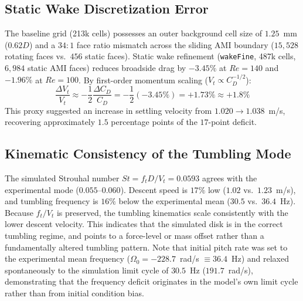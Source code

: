 \documentclass[11pt,a4paper]{article}
\begin{document}
\subsection{Static Wake Discretization Error}
The baseline grid (213k cells) possesses an outer background cell size of $1.25$~mm ($0.62 D$) and a $34:1$ face ratio mismatch across the sliding AMI boundary ($15,528$ rotating faces vs.\ $456$ static faces). Static wake refinement (\texttt{wakeFine}, 487k cells, $6,984$ static AMI faces) reduces broadside drag by $-3.45\%$ at $Re = 140$ and $-1.96\%$ at $Re = 100$. By first-order momentum scaling ($V_t \propto C_D^{-1/2}$):
\begin{equation}
\frac{\Delta V_t}{V_t} \approx -\frac{1}{2} \frac{\Delta C_D}{C_D} = -\frac{1}{2}(-3.45\%) = +1.73\% \approx +1.8\%
\end{equation}
This proxy suggested an increase in settling velocity from $1.020 \to 1.038$~m/s, recovering approximately $1.5$ percentage points of the $17$-point deficit.

\subsection{Kinematic Consistency of the Tumbling Mode}
The simulated Strouhal number $St = f_t D / V_t = 0.0593$ agrees with the experimental mode ($0.055$--$0.060$). Descent speed is $17\%$ low ($1.02$ vs.\ $1.23$~m/s), and tumbling frequency is $16\%$ below the experimental mean ($30.5$ vs.\ $36.4$~Hz). Because $f_t / V_t$ is preserved, the tumbling kinematics scale consistently with the lower descent velocity. This indicates that the simulated disk is in the correct tumbling regime, and points to a force-level or mass offset rather than a fundamentally altered tumbling pattern. Note that initial pitch rate was set to the experimental mean frequency ($\Omega_0 = -228.7$~rad/s $\equiv 36.4$~Hz) and relaxed spontaneously to the simulation limit cycle of $30.5$~Hz ($191.7$~rad/s), demonstrating that the frequency deficit originates in the model's own limit cycle rather than from initial condition bias.
\end{document}
